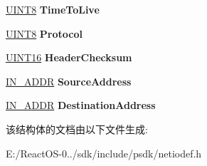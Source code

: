 \begin{DoxyCompactItemize}
\begin{tabbing}
\end{tabbing}\item 
\mbox{\label{struct___i_p_v4___h_e_a_d_e_r_a43b9b5f90c4d2813b085e5e8650bd157}} 
\hyperlink{_processor_bind_8h_ab27e9918b538ce9d8ca692479b375b6a}{U\+I\+N\+T8} {\bfseries Time\+To\+Live}
\item 
\mbox{\label{struct___i_p_v4___h_e_a_d_e_r_a27ded33138d83b28aed9fd5388ecbe0a}} 
\hyperlink{_processor_bind_8h_ab27e9918b538ce9d8ca692479b375b6a}{U\+I\+N\+T8} {\bfseries Protocol}
\item 
\mbox{\label{struct___i_p_v4___h_e_a_d_e_r_a4b7da5cd0080bc6e96dac3bb86938c4c}} 
\hyperlink{_processor_bind_8h_a09f1a1fb2293e33483cc8d44aefb1eb1}{U\+I\+N\+T16} {\bfseries Header\+Checksum}
\item 
\mbox{\label{struct___i_p_v4___h_e_a_d_e_r_aa7efa2963501ef363ef2af45c5c7acf4}} 
\hyperlink{structin__addr}{I\+N\+\_\+\+A\+D\+DR} {\bfseries Source\+Address}
\item 
\mbox{\label{struct___i_p_v4___h_e_a_d_e_r_aba90c3476512fc4cd97d7722a54378cd}} 
\hyperlink{structin__addr}{I\+N\+\_\+\+A\+D\+DR} {\bfseries Destination\+Address}
\end{DoxyCompactItemize}


该结构体的文档由以下文件生成\+:\begin{DoxyCompactItemize}
\item 
E\+:/\+React\+O\+S-\/0../sdk/include/psdk/netiodef.\+h\end{DoxyCompactItemize}
